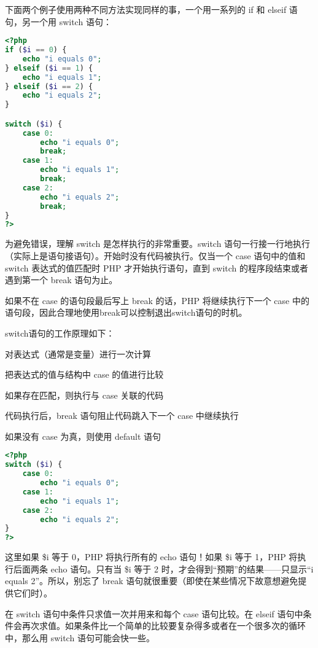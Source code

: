 下面两个例子使用两种不同方法实现同样的事，一个用一系列的 if 和 elseif 语句，另一个用 switch 语句：

\begin{lstlisting}[language=PHP]
<?php
if ($i == 0) {
    echo "i equals 0";
} elseif ($i == 1) {
    echo "i equals 1";
} elseif ($i == 2) {
    echo "i equals 2";
}

switch ($i) {
    case 0:
        echo "i equals 0";
        break;
    case 1:
        echo "i equals 1";
        break;
    case 2:
        echo "i equals 2";
        break;
}
?>
\end{lstlisting}

为避免错误，理解 switch 是怎样执行的非常重要。switch 语句一行接一行地执行（实际上是语句接语句）。开始时没有代码被执行。仅当一个 case 语句中的值和 switch 表达式的值匹配时 PHP 才开始执行语句，直到 switch 的程序段结束或者遇到第一个 break 语句为止。

如果不在 case 的语句段最后写上 break 的话，PHP 将继续执行下一个 case 中的语句段，因此合理地使用break可以控制退出switch语句的时机。


switch语句的工作原理如下：

\begin{compactenum}
\item 对表达式（通常是变量）进行一次计算
\item 把表达式的值与结构中 case 的值进行比较
\item 如果存在匹配，则执行与 case 关联的代码
\item 代码执行后，break 语句阻止代码跳入下一个 case 中继续执行
\item 如果没有 case 为真，则使用 default 语句
\end{compactenum}




\begin{lstlisting}[language=PHP]
<?php
switch ($i) {
    case 0:
        echo "i equals 0";
    case 1:
        echo "i equals 1";
    case 2:
        echo "i equals 2";
}
?>
\end{lstlisting}

这里如果 \$i 等于 0，PHP 将执行所有的 echo 语句！如果 \$i 等于 1，PHP 将执行后面两条 echo 语句。只有当 \$i 等于 2 时，才会得到“预期”的结果——只显示“i equals 2”。所以，别忘了 break 语句就很重要（即使在某些情况下故意想避免提供它们时）。

在 switch 语句中条件只求值一次并用来和每个 case 语句比较。在 elseif 语句中条件会再次求值。如果条件比一个简单的比较要复杂得多或者在一个很多次的循环中，那么用 switch 语句可能会快一些。

